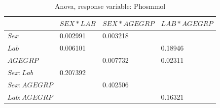 \documentclass{article}
\begin{document}
    \begin{table}
    \begin{center}
    \begin{tabular}{|l|l|l|l|}
      \hline
      &$SEX * LAB$&$SEX * AGEGRP$&$LAB*AGEGRP$\\
      \hline
      $Sex$       &0.002991&0.003218  &\\
      $Lab$       &0.006101&         &0.18946\\
      $AGEGRP$    &       &0.007732  &0.02311\\
      $Sex:Lab$   &0.207392&         &\\
      $Sex:AGEGRP$&       &0.402506  &\\
      $Lab:AGEGRP$&       &         &0.16321\\
      \hline
    \end{tabular}
    \caption{Anova, response variable: Phosmmol}
    \label{table:AnPhosmmol}
    \end{center}
    \end{table}
    
\end{document}
